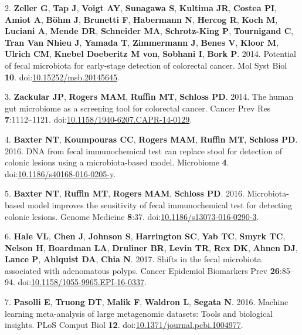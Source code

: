 \documentclass[11pt,]{article}
\begin{document}
\hypertarget{ref-zeller_potential_2014}{}
2. \textbf{Zeller G}, \textbf{Tap J}, \textbf{Voigt AY},
\textbf{Sunagawa S}, \textbf{Kultima JR}, \textbf{Costea PI},
\textbf{Amiot A}, \textbf{Böhm J}, \textbf{Brunetti F},
\textbf{Habermann N}, \textbf{Hercog R}, \textbf{Koch M},
\textbf{Luciani A}, \textbf{Mende DR}, \textbf{Schneider MA},
\textbf{Schrotz-King P}, \textbf{Tournigand C}, \textbf{Tran Van Nhieu
J}, \textbf{Yamada T}, \textbf{Zimmermann J}, \textbf{Benes V},
\textbf{Kloor M}, \textbf{Ulrich CM}, \textbf{Knebel Doeberitz M von},
\textbf{Sobhani I}, \textbf{Bork P}. 2014. Potential of fecal microbiota
for early-stage detection of colorectal cancer. Mol Syst Biol
\textbf{10}.
doi:\href{https://doi.org/10.15252/msb.20145645}{10.15252/msb.20145645}.

\hypertarget{ref-zackular_human_2014}{}
3. \textbf{Zackular JP}, \textbf{Rogers MAM}, \textbf{Ruffin MT},
\textbf{Schloss PD}. 2014. The human gut microbiome as a screening tool
for colorectal cancer. Cancer Prev Res \textbf{7}:1112--1121.
doi:\href{https://doi.org/10.1158/1940-6207.CAPR-14-0129}{10.1158/1940-6207.CAPR-14-0129}.

\hypertarget{ref-baxter_dna_2016}{}
4. \textbf{Baxter NT}, \textbf{Koumpouras CC}, \textbf{Rogers MAM},
\textbf{Ruffin MT}, \textbf{Schloss PD}. 2016. DNA from fecal
immunochemical test can replace stool for detection of colonic lesions
using a microbiota-based model. Microbiome \textbf{4}.
doi:\href{https://doi.org/10.1186/s40168-016-0205-y}{10.1186/s40168-016-0205-y}.

\hypertarget{ref-baxter_microbiota-based_2016}{}
5. \textbf{Baxter NT}, \textbf{Ruffin MT}, \textbf{Rogers MAM},
\textbf{Schloss PD}. 2016. Microbiota-based model improves the
sensitivity of fecal immunochemical test for detecting colonic lesions.
Genome Medicine \textbf{8}:37.
doi:\href{https://doi.org/10.1186/s13073-016-0290-3}{10.1186/s13073-016-0290-3}.

\hypertarget{ref-hale_shifts_2017}{}
6. \textbf{Hale VL}, \textbf{Chen J}, \textbf{Johnson S},
\textbf{Harrington SC}, \textbf{Yab TC}, \textbf{Smyrk TC},
\textbf{Nelson H}, \textbf{Boardman LA}, \textbf{Druliner BR},
\textbf{Levin TR}, \textbf{Rex DK}, \textbf{Ahnen DJ}, \textbf{Lance P},
\textbf{Ahlquist DA}, \textbf{Chia N}. 2017. Shifts in the fecal
microbiota associated with adenomatous polyps. Cancer Epidemiol
Biomarkers Prev \textbf{26}:85--94.
doi:\href{https://doi.org/10.1158/1055-9965.EPI-16-0337}{10.1158/1055-9965.EPI-16-0337}.

\hypertarget{ref-pasolli_machine_2016}{}
7. \textbf{Pasolli E}, \textbf{Truong DT}, \textbf{Malik F},
\textbf{Waldron L}, \textbf{Segata N}. 2016. Machine learning
meta-analysis of large metagenomic datasets: Tools and biological
insights. PLoS Comput Biol \textbf{12}.
doi:\href{https://doi.org/10.1371/journal.pcbi.1004977}{10.1371/journal.pcbi.1004977}.
\end{document}
